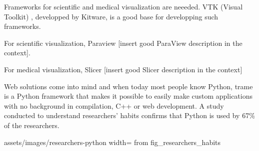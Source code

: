Frameworks for scientific and medical visualization are neeeded. VTK (Visual
Toolkit) \cite{vtk}, developped by Kitware, is a good base for developping such
frameworks.

For scientific visualization, Paraview \cite{paraview} [insert good ParaView
description in the context].

For medical visualization, Slicer \cite{slicer} [insert good Slicer description
in the context] 

Web solutions come into mind and when today most people know Python, trame
\cite{trame} is a Python framework that makes it possible to easily make custom
applications with no background in compilation, C++ or web development.  A study
conducted to understand researchers' habits \cite{researchers_habits} confirms
that Python is used by 67\% of the researchers.

\insertfigure
    {assets/images/researchers-python}
    {width=\textwidth}
    {from \cite{researchers_habits}}
    {fig_researchers_habits}

